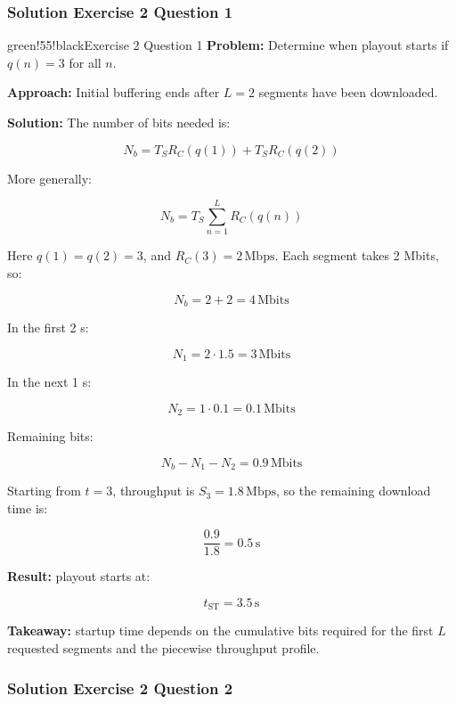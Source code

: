 \subsubsection{Solution Exercise 2 Question 1}

\begin{calloutbox}{green!55!black}{Exercise 2 Question 1}
\textbf{Problem:} Determine when playout starts if $q(n)=3$ for all $n$.

\textbf{Approach:} Initial buffering ends after $L=2$ segments have been downloaded.

\textbf{Solution:} The number of bits needed is:

\[
N_b = T_S R_C(q(1)) + T_S R_C(q(2))
\]

More generally:

\[
N_b = T_S \sum_{n=1}^{L} R_C(q(n))
\]

Here $q(1)=q(2)=3$, and $R_C(3)=2\,\text{Mbps}$. Each segment takes 2 Mbits, so:

\[
N_b = 2 + 2 = 4\,\text{Mbits}
\]

In the first 2 s:

\[
N_1 = 2 \cdot 1.5 = 3\,\text{Mbits}
\]

In the next 1 s:

\[
N_2 = 1 \cdot 0.1 = 0.1\,\text{Mbits}
\]

Remaining bits:

\[
N_b - N_1 - N_2 = 0.9\,\text{Mbits}
\]

Starting from $t=3$, throughput is $S_3=1.8\,\text{Mbps}$, so the remaining download time is:

\[
\frac{0.9}{1.8} = 0.5\,\text{s}
\]

\textbf{Result:} playout starts at:

\[
t_{\text{ST}} = 3.5\,\text{s}
\]

\textbf{Takeaway:} startup time depends on the cumulative bits required for the first $L$ requested segments and the piecewise throughput profile.
\end{calloutbox}

\subsubsection{Solution Exercise 2 Question 2}


